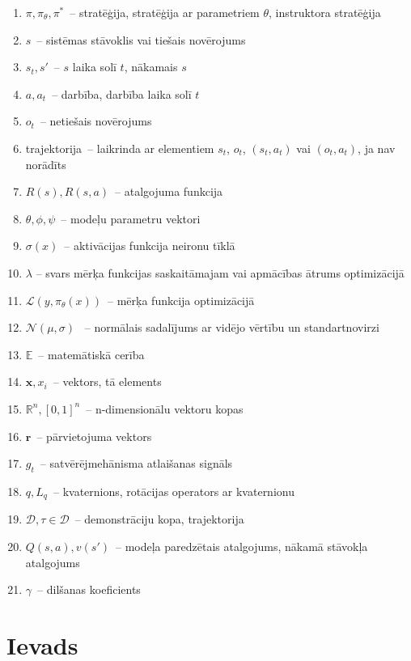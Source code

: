 \documentclass[12pt, a4paper]{article}
\numberwithin{equation}{section} %
\begin{document}
\begin{enumerate}
    \item $\pi, \pi_{\theta}, \pi^*$~-- stratēģija, stratēģija ar parametriem $\theta$, instruktora stratēģija
    \item $s$~-- sistēmas stāvoklis vai tiešais novērojums
    \item $s_t, s'$~-- $s$ laika solī $t$, nākamais $s$
    \item $a, a_t$~-- darbība, darbība laika solī $t$
    \item $o_t$~-- netiešais novērojums
    \item trajektorija~-- laikrinda ar elementiem $s_t$, $o_t$, $(s_t, a_t)$ vai $(o_t, a_t)$, ja nav norādīts
    \item $R(s), R(s,a)$~-- atalgojuma funkcija
    \item $\theta, \phi, \psi$~-- modeļu parametru vektori
    \item $\sigma(x)$~-- aktivācijas funkcija neironu tīklā
    \item $\lambda$ -- svars mērķa funkcijas saskaitāmajam vai apmācības ātrums optimizācijā
    \item $\mathcal{L}(y, \pi_{\theta}(x))$~-- mērķa funkcija optimizācijā
    \item $\mathcal{N}(\mu, \sigma)$ ~-- normālais sadalījums ar vidējo vērtību un standartnovirzi
    \item $\mathbb{E}$~-- matemātiskā cerība
    \item $\boldsymbol{x}, x_i$~-- vektors, tā elements
    \item $\mathbb{R}^n, [0,1]^n$~-- n-dimensionālu vektoru kopas
    \item $\boldsymbol{r}$~-- pārvietojuma vektors
    \item $g_t$~-- satvērējmehānisma atlaišanas signāls
    \item $q, L_q$~-- kvaternions, rotācijas operators ar kvaternionu
    \item $\mathcal{D}, \tau \in \mathcal{D}$~-- demonstrāciju kopa, trajektorija
    \item $Q(s,a), v(s')$~-- modeļa paredzētais atalgojums, nākamā stāvokļa atalgojums
    \item $\gamma$~-- dilšanas koeficients
\end{enumerate}


\newpage
{}
\section*{Ievads} %
\end{document}
